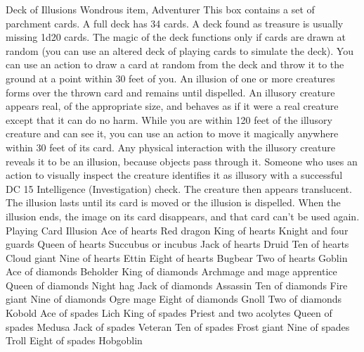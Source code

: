 Deck of Illusions
Wondrous item, Adventurer This box contains a set of parchment cards. A full deck has 34 cards. A deck found as treasure is usually missing 1d20  cards.  The magic of the deck functions only if cards are drawn at random (you can use an altered deck of playing cards to simulate the deck). You can use an action to draw a card at random from the deck and throw it to the ground at a point within 30 feet of you.  An illusion of one or more creatures forms over the thrown card and remains until dispelled. An illusory creature appears real, of the appropriate size, and behaves as if it were a real creature except that it can do no harm. While you are within 120 feet of the illusory creature and can see it, you can use an action to move it magically anywhere within 30 feet of its card. Any physical interaction with the illusory creature reveals it to be an illusion, because objects pass through it. Someone who uses an action to visually inspect the creature identifies it as illusory with a successful DC 15 Intelligence (Investigation) check. The creature then appears translucent.
The illusion lasts until its card is moved or the illusion is dispelled. When the illusion ends, the image on its card disappears, and that card can't be used again.
Playing Card       Illusion                            
Ace of hearts      Red dragon                          
King of hearts     Knight and four guards              
Queen of hearts    Succubus or incubus                 
Jack of hearts     Druid                               
Ten of hearts      Cloud giant                         
Nine of hearts     Ettin                               
Eight of hearts    Bugbear                             
Two of  hearts     Goblin                              
Ace of diamonds    Beholder                            
King of diamonds   Archmage and mage apprentice        
Queen of diamonds  Night hag                           
Jack of diamonds   Assassin                            
Ten of diamonds    Fire giant                          
Nine of diamonds   Ogre mage                           
Eight of diamonds  Gnoll                               
Two of diamonds    Kobold                              
Ace of  spades     Lich                                
King of spades     Priest and two acolytes             
Queen of spades    Medusa                              
Jack of spades     Veteran                             
Ten of spades      Frost giant                         
Nine of spades     Troll                               
Eight of spades    Hobgoblin                           
